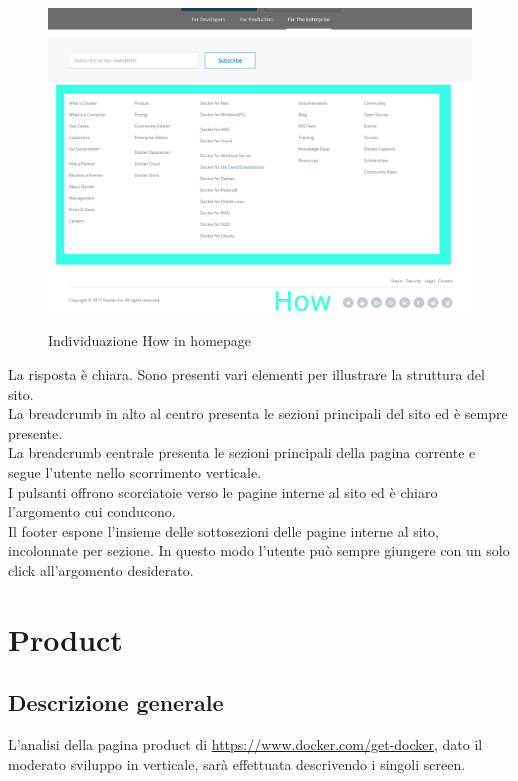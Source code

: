 \documentclass[a4paper]{article}
\begin{document}
\begin{figure}[H]
	\centering
	\includegraphics[width=\linewidth]{images/how3.png}
    \label{fig:homepagehow3}
    \caption{Individuazione How in homepage}
\end{figure}

\noindent La risposta è chiara. Sono presenti vari elementi per illustrare la struttura del sito.
\\
La breadcrumb in alto al centro presenta le sezioni principali del sito ed è sempre presente.
\\
La breadcrumb centrale presenta le sezioni principali della pagina corrente e segue l'utente nello scorrimento verticale.
\\
I pulsanti offrono scorciatoie verso le pagine interne al sito ed è chiaro l'argomento cui conducono.
\\
Il footer espone l'insieme delle sottosezioni delle pagine interne al sito, incolonnate per sezione. In questo modo l'utente può sempre giungere con un solo click all'argomento desiderato.

\section{Product}

\subsection{Descrizione generale}
L'analisi della pagina product di \url{https://www.docker.com/get-docker}, dato il moderato sviluppo in verticale, sarà effettuata descrivendo i singoli screen.
\end{document}
